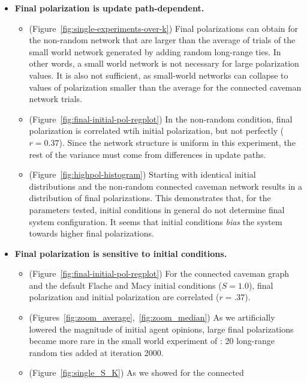 \documentclass[11pt,letterpaper]{article}
\begin{document}
\begin{itemize}
  \item \textbf{Final polarization is update path-dependent.}
    \begin{itemize}
      \item (Figure~\ref{fig:single-experiments-over-k})
        Final polarizations can obtain for the non-random network that
        are larger than the average of trials of the small world network
        generated by adding random long-range ties. In other words, a
        small world network is not necessary for large polarization values.
        It is also not sufficient, as small-world networks can collapse to
        values of polarization smaller than the average for the connected
        caveman network trials. 
      \item (Figure~\ref{fig:final-initial-pol-regplot}) In the non-random
        condition, final polarization is correlated wtih initial polarization,
        but not perfectly ($r=0.37$). Since the network structure is uniform in this
        experiment, the rest of the variance must come from differences in 
        update paths.
      \item (Figure~\ref{fig:highpol-histogram}) 
        Starting with identical initial distributions
        and the non-random connected caveman network results in a distribution
        of final polarizations. This demonstrates that, for the parameters
        tested, initial conditions in general do not determine final system
        configuration. It seems that initial conditions \emph{bias} the system
        towards higher final polarizations.
    \end{itemize}
  \item \textbf{Final polarization is sensitive to initial conditions.}    
    \begin{itemize}
      \item (Figure~\ref{fig:final-initial-pol-regplot}) For the connected 
        caveman graph and the default Flache and Macy initial conditions ($S=1.0$),
        final polarization and initial polarization are 
        correlated ($r=.37$). 
      \item (Figures~\ref{fig:zoom_average},~\ref{fig:zoom_median}) 
        As we artificially lowered the magnitude of 
        initial agent opinions, large final polarizations became more rare
        in the small world experiment of : 
        20 long-range random ties added at iteration 2000.
      \item (Figure~\ref{fig:single_S_K}) As we showed for the connected 

\end{itemize}
\end{itemize}
\end{document}
